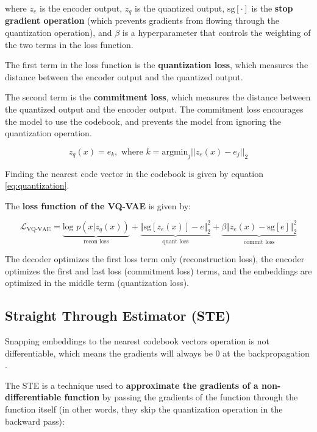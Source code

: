 where $z_e$ is the encoder output, $z_q$ is the quantized output, $\text{sg}[\cdot]$ is the \textbf{stop gradient operation} (which prevents gradients from flowing through the quantization operation), and $\beta$ is a hyperparameter that controls the weighting of the two terms in the loss function. 

The first term in the loss function is the \textbf{quantization loss}, which measures the distance between the encoder output and the quantized output. 

The second term is the \textbf{commitment loss}, which measures the distance between the quantized output and the encoder output. The commitment loss encourages the model to use the codebook, and prevents the model from ignoring the quantization operation.

\begin{equation}
    \label{eq:quantization}
    z_q(x)=e_k, \text{  where } k = \text{argmin}_j || z_e(x) - e_j ||_2
\end{equation}

Finding the nearest code vector in the codebook is given by equation \ref{eq:quantization}.

The \textbf{loss function of the VQ-VAE} is given by:

\begin{equation}
    \mathcal{L}_\text{VQ-VAE} = 
    \underbrace{\text{log } p(x|z_q(x))}_{\text{recon loss}} + 
    \underbrace{\Vert \text{sg}[z_e(x)] - e \Vert_2^2}_{\text{quant loss}} +
    \underbrace{\beta \Vert z_e(x) - \text{sg}[e] \Vert_2^2}_{\text{commit loss}}
    \label{eq:vqvae_loss}
\end{equation}
    
The decoder optimizes the first loss term only (reconstruction loss), the encoder optimizes the first and last loss (commitment loss) terms, and the embeddings are optimized in the middle term (quantization loss).






\subsection{Straight Through Estimator (STE)}
\label{ste}

Snapping embeddings to the nearest codebook vectors operation is not differentiable, which means the gradients will always be 0 at the backpropagation \cite{why_round_function_is_not_differentiable}.

The STE is a technique used to \textbf{approximate the gradients of a non-differentiable function} by passing the gradients of the function through the function itself (in other words, they skip the quantization operation in the backward pass):


